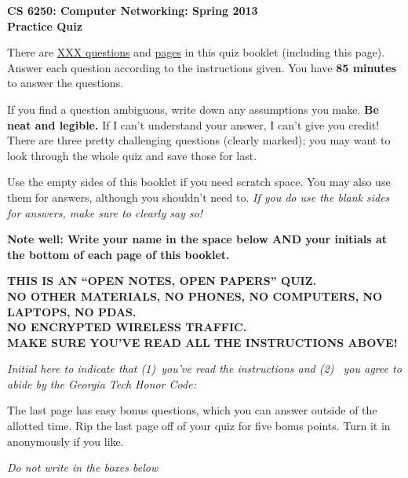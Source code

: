 \documentclass[11pt]{article}
\begin{document}
\begin{center}
{\Large{\bf CS 6250: Computer Networking: Spring 2013} \\
 \vspace{.15in} \Huge{\bf Practice Quiz}} 
\vspace{.2in}

\begin{boxedminipage}[h]{6in}
There are \underline{XXX questions} and
  \underline{\pageref{lastpage} pages} in this quiz booklet (including
  this page).  Answer each question according to the instructions given.
  You have {\bf 85 minutes} to answer the questions.



\vspace{.1in} 
If you find a question ambiguous, write down any
assumptions you make.  {\bf Be neat and legible.}  If I can't
understand your answer, I can't give you credit!  There are three pretty
challenging questions (clearly marked); you may want to look through the
whole quiz and save those for last.

\vspace{.1in} 
Use the empty sides of this booklet if you need scratch space.  You
may also use them for answers, although you shouldn't need to.  {\em If you
do use the blank sides for answers, make sure to clearly say so!}

\vspace{.1in} 
{\bf Note well: Write your name in the space below AND your initials at the bottom of each
page of this booklet.}

\begin{center}{\bf THIS IS AN ``OPEN NOTES, OPEN PAPERS'' QUIZ.\\
NO OTHER MATERIALS, NO PHONES, NO COMPUTERS, NO LAPTOPS, NO PDAS.\\
NO ENCRYPTED WIRELESS TRAFFIC. \\
MAKE SURE YOU'VE READ ALL THE INSTRUCTIONS ABOVE!}
\end{center}
{\em Initial here to indicate that (1)~you've read the instructions and (2)~
you agree to abide by the Georgia Tech Honor Code: }



\vspace{.1in} The last page has easy bonus questions, which you can
answer outside of the allotted time.  Rip the last page off of your
quiz for five bonus points.  Turn it in anonymously if you like.

\end{boxedminipage}
\end{center}
\vspace*{0.25in}
\begin{center}
{\it Do not write in the boxes below}
\end{center}
\end{document}
